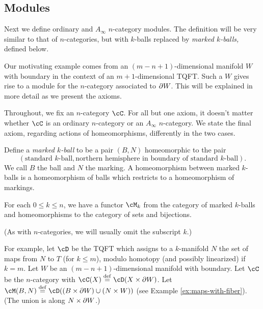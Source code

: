 
\subsection{Modules}

Next we define ordinary and $A_\infty$ $n$-category modules.
The definition will be very similar to that of $n$-categories,
but with $k$-balls replaced by {\it marked $k$-balls,} defined below.

Our motivating example comes from an $(m{-}n{+}1)$-dimensional manifold $W$ with boundary
in the context of an $m{+}1$-dimensional TQFT.
Such a $W$ gives rise to a module for the $n$-category associated to $\partial W$.
This will be explained in more detail as we present the axioms.

Throughout, we fix an $n$-category $\cC$.
For all but one axiom, it doesn't matter whether $\cC$ is an ordinary $n$-category or an $A_\infty$ $n$-category.
We state the final axiom, regarding actions of homeomorphisms, differently in the two cases.

Define a {\it marked $k$-ball} to be a pair $(B, N)$ homeomorphic to the pair
$$(\text{standard $k$-ball}, \text{northern hemisphere in boundary of standard $k$-ball}).$$
We call $B$ the ball and $N$ the marking.
A homeomorphism between marked $k$-balls is a homeomorphism of balls which
restricts to a homeomorphism of markings.

\begin{module-axiom} \label{module-axiom-funct}
{For each $0 \le k \le n$, we have a functor $\cM_k$ from 
the category of marked $k$-balls and 
homeomorphisms to the category of sets and bijections.}
\end{module-axiom}

(As with $n$-categories, we will usually omit the subscript $k$.)

For example, let $\cD$ be the TQFT which assigns to a $k$-manifold $N$ the set 
of maps from $N$ to $T$ (for $k\le m$), modulo homotopy (and possibly linearized) if $k=m$.
Let $W$ be an $(m{-}n{+}1)$-dimensional manifold with boundary.
Let $\cC$ be the $n$-category with $\cC(X) \deq \cD(X\times \bd W)$.
Let $\cM(B, N) \deq \cD((B\times \bd W)\cup (N\times W))$
(see Example \ref{ex:maps-with-fiber}).
(The union is along $N\times \partial W$.)

